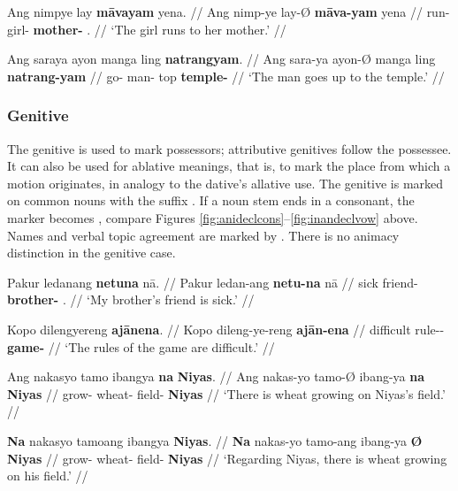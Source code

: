 \pex
\a\label{ex:datloc}\begingl
	\gla Ang nimpye lay \textbf{māvayam} yena. //
	\glb Ang nimp-ye lay-Ø \textbf{māva-yam} yena //
	\glc \AgtT{} run-\TsgF{} girl-\Top{} \textbf{mother-\Dat{}} 
		\TsgF{}.\Gen{} //
	\glft `The girl runs to her mother.' //
\endgl

\a\label{ex:datlocprep}\begingl
	\gla Ang saraya ayon manga ling \textbf{natrangyam}. //
	\glb Ang sara-ya ayon-Ø manga ling \textbf{natrang-yam} //
	\glc \AgtT{} go-\TsgM{} man-\Top{} \Dyn{} top \textbf{temple-\Dat{}} //
	\glft `The man goes up to the temple.' //
\endgl

\xe


\subsubsection{Genitive}
\label{subsubsec:genitive}

The genitive is used to mark possessors; attributive genitives follow the 
possessee. It can also be used for ablative meanings, that is, to mark the place 
from which a motion originates, in analogy to the dative's allative use. 
The genitive is marked on common nouns with the suffix . If a 
noun stem ends in a consonant, the marker becomes , compare 
Figures \ref{fig:anideclcons}–\ref{fig:inandeclvow} above. Names and verbal 
topic agreement are marked by . There is no animacy distinction in 
the genitive case.

\pex
\a\begingl
	\gla Pakur ledanang \textbf{netuna} nā. //
	\glb Pakur ledan-ang \textbf{netu-na} nā //
	\glc sick friend-\Aarg{} \textbf{brother-\Gen{}} \Fsg{}.\Gen{} //
	\glft `My brother's friend is sick.' //
\endgl

\a\begingl
	\gla Kopo dilengyereng \textbf{ajānena}. //
	\glb Kopo dileng-ye-reng \textbf{ajān-ena} //
	\glc difficult rule-\Pl{}-\AargI{} \textbf{game-\Gen{}} //
	\glft `The rules of the game are difficult.' //
\endgl

\a\begingl
	\gla Ang nakasyo tamo ibangya \textbf{na} \textbf{Niyas}. //
	\glb Ang nakas-yo tamo-Ø ibang-ya \textbf{na} \textbf{Niyas} //
	\glc \AgtT{} grow-\TsgN{} wheat-\Top{} field-\Loc{} \textbf{\Gen} 
		\textbf{Niyas} //
	\glft `There is wheat growing on Niyas's field.' //
\endgl

\a\begingl
	\gla \textbf{Na} nakasyo tamoang ibangya \textbf{{}} \textbf{Niyas}. //
	\glb \textbf{Na} nakas-yo tamo-ang ibang-ya \textbf{Ø} \textbf{Niyas} //
	\glc \textbf{\GenT{}} grow-\TsgN{} wheat-\Aarg{} field-\Loc{} 
		\textbf{\Top} \textbf{Niyas} //
	\glft `Regarding Niyas, there is wheat growing on his field.' //
\endgl

